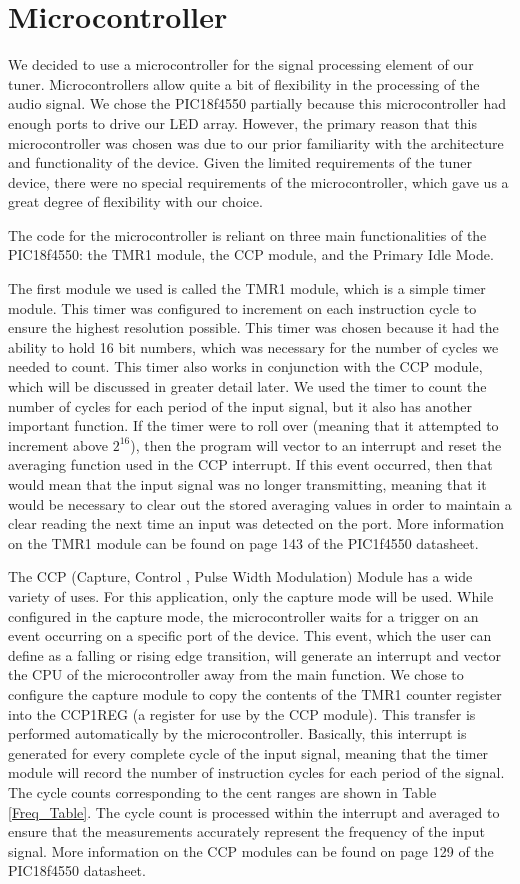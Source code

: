 \documentclass[12pt]{article}
\begin{document}
\section{Microcontroller}
We decided to use a microcontroller for the signal processing element of our tuner. Microcontrollers
allow quite a bit of flexibility in the processing of the audio signal. We chose the PIC18f4550 partially
because this microcontroller had enough ports to drive our LED array. However, the primary reason
that this microcontroller was chosen was due to our prior familiarity with the architecture and
functionality of the device. Given the limited requirements of the tuner device, there were no special
requirements of the microcontroller, which gave us a great degree of flexibility with our choice.

The code for the microcontroller is reliant on three main functionalities of the PIC18f4550: the TMR1
module, the CCP module, and the Primary Idle Mode.

The first module we used is called the TMR1 module, which is a simple timer module. This timer was
configured to increment on each instruction cycle to ensure the highest resolution possible. This timer
was chosen because it had the ability to hold 16 bit numbers, which was necessary for the number of
cycles we needed to count. This timer also works in conjunction with the CCP module, which will be
discussed in greater detail later. We used the timer to count the number of cycles for each period of the
input signal, but it also has another important function. If the timer were to roll over (meaning that it
attempted to increment above $2^{16}$), then the program will vector to an interrupt and reset the averaging
function used in the CCP interrupt. If this event occurred, then that would mean that the input signal
was no longer transmitting, meaning that it would be necessary to clear out the stored averaging values
in order to maintain a clear reading the next time an input was detected on the port. More information on
the TMR1 module can be found on page 143 of the PIC1f4550 datasheet.

The CCP (Capture, Control , Pulse Width Modulation) Module has a wide variety of uses. For
this application, only the capture mode will be used. While configured in the capture mode, the
microcontroller waits for a trigger on an event occurring on a specific port of the device. This event, which
the user can define as a falling or rising edge transition, will generate an interrupt and vector the CPU of
the microcontroller away from the main function. We chose to configure the capture module to copy
the contents of the TMR1 counter register into the CCP1REG (a register for use by the CCP module).
This transfer is performed automatically by the microcontroller. Basically, this interrupt is generated for every complete
cycle of the input signal, meaning that the timer module will record the number of instruction cycles
for each period of the signal. The cycle counts corresponding to the cent ranges are shown in Table
\ref{Freq_Table}. The cycle count is processed within the interrupt and averaged to ensure that the measurements
accurately represent the frequency of the input signal. More information on the CCP modules can be found
on page 129 of the PIC18f4550 datasheet.
\end{document}
